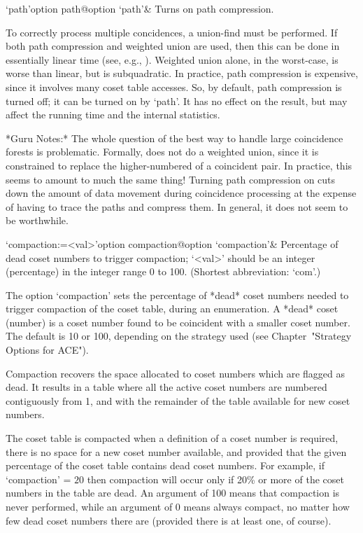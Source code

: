 \>`path'{option path}@{option `path'}&
Turns on path compression.

To correctly  process  multiple  concidences,  a  union-find  must  be
performed. If both path compression and weighted union are used,  then
this can be done in essentially linear time (see, e.g., \cite{CLR90}).
Weighted union alone, in the worst-case, is worse than linear, but  is
subquadratic. In practice, path compression  is  expensive,  since  it
involves many coset table accesses. So, by default,  path  compression
is turned off; it can be turned on by `path'. It has no effect on  the
result, but may affect the running time and the internal statistics.

*Guru Notes:*
The whole question of the best way to handle large coincidence forests
is problematic.  Formally, {\ACE} does  not do a weighted union, since
it is constrained to replace the higher-numbered of a coincident pair.
In practice,  this seems  to amount to  much the same  thing!  Turning
path  compression on  cuts down  the  amount of  data movement  during
coincidence processing at the expense of having to trace the paths and
compress them.  In general, it does not seem to be worthwhile.

\>`compaction:=<val>'{option compaction}@{option `compaction'}&
Percentage of dead coset numbers to trigger compaction; 
`<val>' should be an integer (percentage) in the integer  range  0  to
100. (Shortest abbreviation: `com'.)

The option `compaction' sets the percentage of  *dead*  coset  numbers
needed  to  trigger  compaction  of  the  coset   table,   during   an
enumeration. A *dead* coset (number) is a coset  number  found  to  be
coincident with a smaller coset number. The  default  is  10  or  100,
depending on the strategy  used  (see  Chapter~"Strategy  Options  for
ACE").

Compaction recovers the space allocated to  coset  numbers  which  are
flagged as dead. It results in a table  where  all  the  active  coset
numbers are numbered contiguously from 1, and with  the  remainder  of
the table available for new coset numbers.

The coset table is compacted when a definition of a  coset  number  is
required, there is no space for a  new  coset  number  available,  and
provided that the given percentage of the coset  table  contains  dead
coset numbers. For example, if `compaction'  =  $20$  then  compaction
will occur only if 20\% or more of the coset numbers in the table  are
dead. An argument of 100 means that  compaction  is  never  performed,
while an argument of 0 means always compact, no matter  how  few  dead
coset numbers there are (provided there is at least one, of course).

